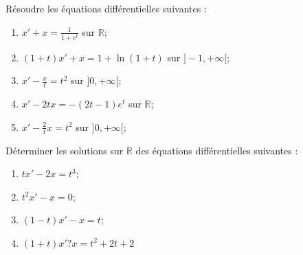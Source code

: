 \documentclass{book}
\begin{document}
\begin{Exercice}
Résoudre les équations différentielles suivantes :
\begin{enumerate}
\item $x'+x=\frac{1}{1+e^t}$ sur $\mathbb R$;
\item $(1+t)x'+x=1+\ln(1+t)$ sur $]-1,+\infty[$;
\item $x'-\frac xt=t^2$ sur $]0,+\infty[$;
\item $x'-2tx=-(2t-1)e^t$ sur $\mathbb R$;
\item $x'-\frac{2}tx=t^2$ sur $]0,+\infty[$;
\end{enumerate}
\end{Exercice}
\begin{Exercice}
Déterminer les solutions sur $\mathbb R$ des équations différentielles suivantes :
\begin{enumerate}
\item $tx'-2x=t^3$;
\item $t^2x'-x=0$;
\item $(1-t)x'-x=t$;
\item $(1 + t)x' ? x = t^2+2t+2$
\end{enumerate}
\end{Exercice}
\end{document}
